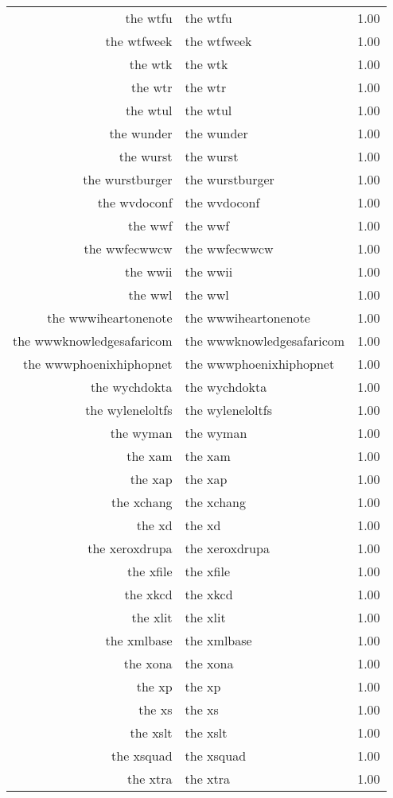 \begin{table}[ht]
\begin{tabular}{rlr}
  the wtfu & the wtfu & 1.00 \\ 
  the wtfweek & the wtfweek & 1.00 \\ 
  the wtk & the wtk & 1.00 \\ 
  the wtr & the wtr & 1.00 \\ 
  the wtul & the wtul & 1.00 \\ 
  the wunder & the wunder & 1.00 \\ 
  the wurst & the wurst & 1.00 \\ 
  the wurstburger & the wurstburger & 1.00 \\ 
  the wvdoconf & the wvdoconf & 1.00 \\ 
  the wwf & the wwf & 1.00 \\ 
  the wwfecwwcw & the wwfecwwcw & 1.00 \\ 
  the wwii & the wwii & 1.00 \\ 
  the wwl & the wwl & 1.00 \\ 
  the wwwiheartonenote & the wwwiheartonenote & 1.00 \\ 
  the wwwknowledgesafaricom & the wwwknowledgesafaricom & 1.00 \\ 
  the wwwphoenixhiphopnet & the wwwphoenixhiphopnet & 1.00 \\ 
  the wychdokta & the wychdokta & 1.00 \\ 
  the wyleneloltfs & the wyleneloltfs & 1.00 \\ 
  the wyman & the wyman & 1.00 \\ 
  the xam & the xam & 1.00 \\ 
  the xap & the xap & 1.00 \\ 
  the xchang & the xchang & 1.00 \\ 
  the xd & the xd & 1.00 \\ 
  the xeroxdrupa & the xeroxdrupa & 1.00 \\ 
  the xfile & the xfile & 1.00 \\ 
  the xkcd & the xkcd & 1.00 \\ 
  the xlit & the xlit & 1.00 \\ 
  the xmlbase & the xmlbase & 1.00 \\ 
  the xona & the xona & 1.00 \\ 
  the xp & the xp & 1.00 \\ 
  the xs & the xs & 1.00 \\ 
  the xslt & the xslt & 1.00 \\ 
  the xsquad & the xsquad & 1.00 \\ 
  the xtra & the xtra & 1.00 \\ 

\end{tabular}
\end{table}

